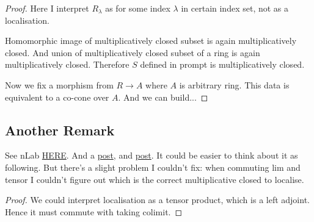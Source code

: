\begin{proof}
Here I interpret $R_{\lambda}$ as for some index $\lambda$ in certain index set, not as a localisation.

Homomorphic image of multiplicatively closed subset is again multiplicatively closed. And union of multiplicatively closed subset of a ring is again multiplicatively closed. Therefore $S$ defined in prompt is multiplicatively closed. 

Now we fix a morphism from $R\to A$ where $A$ is arbitrary ring. This data is equivalent to a co-cone over $A$. And we can build... 

\end{proof}

\subsection{Another Remark}
See nLab \href{https://ncatlab.org/nlab/show/adjoints+preserve+%28co-%29limits}{HERE}. And a \href{https://math.stackexchange.com/questions/505479/does-localization-commute-with-direct-inverse-limits}{post}, and \href{https://math.stackexchange.com/questions/1902377/localization-as-colimit-defining-the-preorder}{post}. It could be easier to think about it as following. But there's a slight problem I couldn't fix: when commuting lim and tensor I couldn't figure out which is the correct multiplicative closed to localise.
\begin{proof}
	We could interpret localisation as a tensor product, which is a left adjoint. Hence it must commute with taking colimit.
\end{proof}
